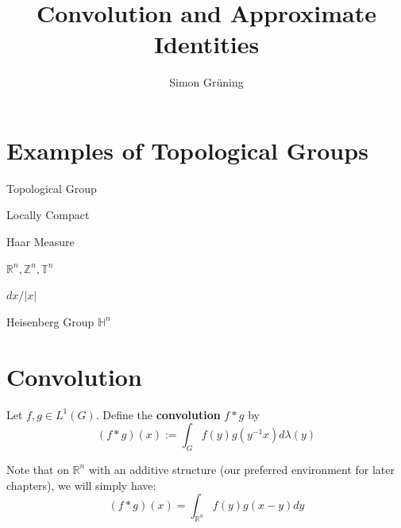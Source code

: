 


\title{Convolution and Approximate Identities}
\author{Simon Gr\"uning}
\address[Simon Gr\"uning]{University of Zurich, R\"{a}mistrasse 71, 8006 Zurich}



\maketitle
\addtocounter{section}{1}


\section{Examples of Topological Groups}



\begin{definition}
Topological Group
\end{definition}

\begin{definition}
Locally Compact
\end{definition}

\begin{definition}
Haar Measure
\end{definition}

	\begin{example}
	$\mathbb{R}^n, \mathbb{Z}^n, \mathbb{T}^n$
	\end{example}
	
\begin{example}
$dx/|x|$
\end{example}	
	
\begin{example}
Heisenberg Group $\mathbb{H}^n$
\end{example}	

	
\section{Convolution}

\begin{definition}
 Let $f,g \in L^1(G)$. Define the \textbf{convolution} $f*g$ by
\begin{equation}
 (f*g)(x) := \int_G f(y)g(y^{-1}x) d\lambda(y)
\end{equation}
\end{definition}

\begin{remark}
Note that on $\mathbb{R}^n$ with an additive structure (our preferred environment for later chapters), we will simply have:
\begin{equation*}
 (f*g)(x) = \int_{\mathbb{R}^n} f(y)g(x-y) dy
\end{equation*}
\end{remark}

